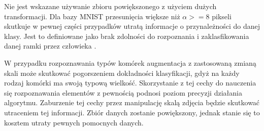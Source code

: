 Nie jest wskazane używanie zbioru powiększonego z użyciem dużych transformacji. Dla bazy MNIST przesunięcia większe niż \(\alpha >= 8\) pikseli skutkuje w pewnej części przypadków utratą informacje o przynależności do danej klasy. Jest to definiowane jako brak zdolności do rozpoznania i zaklasfikowania danej ramki przez człowieka \cite{augmentation}.

W przypadku rozpoznawania typów komórek augmentacja z zastosowaną zmianą skali może skutkować pogorszeniem dokładności klasyfikacji, gdyż na każdy rodzaj komórki ma swoją typową wielkość. Skorzystanie z tej cechy do nauczenia się rozpoznawania elementów z pewnością podnosi poziom precyzji działania algorytmu. Zaburzenie tej cechy przez manipulację skalą zdjęcia będzie skutkować utraceniem tej informacji. Zbiór danych zostanie powiększony, jednak stanie się to kosztem utraty pewnych pomocnych danych.